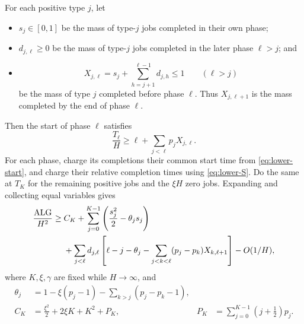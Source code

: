 \begin{claim}
\label{clm:lower-finite-accounting}
For each positive type $j$, let
\begin{itemize}
\item $s_j\in[0,1]$ be the mass of type-$j$ jobs completed in their own
      phase;
\item $d_{j,\ell}\ge0$ be the mass of type-$j$ jobs completed in the later
      phase $\ell>j$; and
\item
\[
  X_{j,\ell}=s_j+\sum_{h=j+1}^{\ell-1}d_{j,h}\le1
  \qquad(\ell>j)
\]
be the mass of type $j$ completed before phase $\ell$.  Thus
$X_{j,\ell+1}$ is the mass completed by the end of phase $\ell$.
\end{itemize}
Then the start of phase $\ell$ satisfies
\begin{equation}
  \frac{T_\ell}{H}
  \ge \ell+\sum_{j<\ell}p_jX_{j,\ell}.
  \label{eq:lower-start}
\end{equation}
For each phase, charge its completions their common start time from
\cref{eq:lower-start}, and charge their relative completion times using
\cref{eq:lower-S}.  Do the same at $T_K$ for the remaining positive jobs
and the $\xi H$ zero jobs.  Expanding and collecting equal variables gives
\begin{align}
 \frac{\operatorname{ALG}}{H^2}
 \ge{}& C_K
 +\sum_{j=0}^{K-1}\left(\frac{s_j^2}{2}-\theta_js_j\right)
 \nonumber\\
 &+\sum_{j<\ell}d_{j,\ell}
 \left[
   \ell-j-\theta_j
   -\sum_{j<k<\ell}(p_j-p_k)X_{k,\ell+1}
 \right]-O(1/H),
 \label{eq:lower-accounting}
\end{align}
where $K,\xi,\gamma$ are fixed while $H\to\infty$, and
\begin{align}
 \theta_j
   &=1-\xi(p_j-1)-\sum_{k>j}(p_j-p_k-1),
   \label{eq:lower-theta}\\
 C_K
   &=\frac{\xi^2}{2}+2\xi K+K^2+P_K,
 &
 P_K&=\sum_{j=0}^{K-1}\left(j+\frac12\right)p_j.
 \label{eq:lower-CP}
\end{align}
\end{claim}

